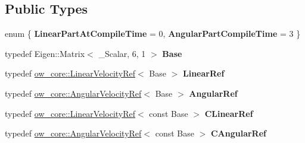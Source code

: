 \subsection*{Public Types}
\begin{DoxyCompactItemize}
\item 
enum \{ {\bfseries Linear\+Part\+At\+Compile\+Time} = 0, 
{\bfseries Angular\+Part\+Compile\+Time} = 3
 \}\hypertarget{structow_1_1traits_3_01ow__core_1_1CartesianVelocity_3_01__Scalar_01_4_01_4_a1f912888f5ee9ce792a5c1d449d145ad}{}\label{structow_1_1traits_3_01ow__core_1_1CartesianVelocity_3_01__Scalar_01_4_01_4_a1f912888f5ee9ce792a5c1d449d145ad}

\item 
typedef Eigen\+::\+Matrix$<$ \+\_\+\+Scalar, 6, 1 $>$ {\bfseries Base}\hypertarget{structow_1_1traits_3_01ow__core_1_1CartesianVelocity_3_01__Scalar_01_4_01_4_a4182d5230b4c5f7fb49aee9aef742364}{}\label{structow_1_1traits_3_01ow__core_1_1CartesianVelocity_3_01__Scalar_01_4_01_4_a4182d5230b4c5f7fb49aee9aef742364}

\item 
typedef \hyperlink{classow__core_1_1LinearVelocityRef}{ow\+\_\+core\+::\+Linear\+Velocity\+Ref}$<$ Base $>$ {\bfseries Linear\+Ref}\hypertarget{structow_1_1traits_3_01ow__core_1_1CartesianVelocity_3_01__Scalar_01_4_01_4_a8771c831a68f633d846af4e3c07b6fd4}{}\label{structow_1_1traits_3_01ow__core_1_1CartesianVelocity_3_01__Scalar_01_4_01_4_a8771c831a68f633d846af4e3c07b6fd4}

\item 
typedef \hyperlink{classow__core_1_1AngularVelocityRef}{ow\+\_\+core\+::\+Angular\+Velocity\+Ref}$<$ Base $>$ {\bfseries Angular\+Ref}\hypertarget{structow_1_1traits_3_01ow__core_1_1CartesianVelocity_3_01__Scalar_01_4_01_4_ac3973537314f9ac45c4cc9ea20b438fd}{}\label{structow_1_1traits_3_01ow__core_1_1CartesianVelocity_3_01__Scalar_01_4_01_4_ac3973537314f9ac45c4cc9ea20b438fd}

\item 
typedef \hyperlink{classow__core_1_1LinearVelocityRef}{ow\+\_\+core\+::\+Linear\+Velocity\+Ref}$<$ const Base $>$ {\bfseries C\+Linear\+Ref}\hypertarget{structow_1_1traits_3_01ow__core_1_1CartesianVelocity_3_01__Scalar_01_4_01_4_ae9a2c6da248084e2a59b96bb815262bc}{}\label{structow_1_1traits_3_01ow__core_1_1CartesianVelocity_3_01__Scalar_01_4_01_4_ae9a2c6da248084e2a59b96bb815262bc}

\item 
typedef \hyperlink{classow__core_1_1AngularVelocityRef}{ow\+\_\+core\+::\+Angular\+Velocity\+Ref}$<$ const Base $>$ {\bfseries C\+Angular\+Ref}\hypertarget{structow_1_1traits_3_01ow__core_1_1CartesianVelocity_3_01__Scalar_01_4_01_4_addd4bedd71b846f082eee9aeed9b954c}{}\label{structow_1_1traits_3_01ow__core_1_1CartesianVelocity_3_01__Scalar_01_4_01_4_addd4bedd71b846f082eee9aeed9b954c}

\end{DoxyCompactItemize}


